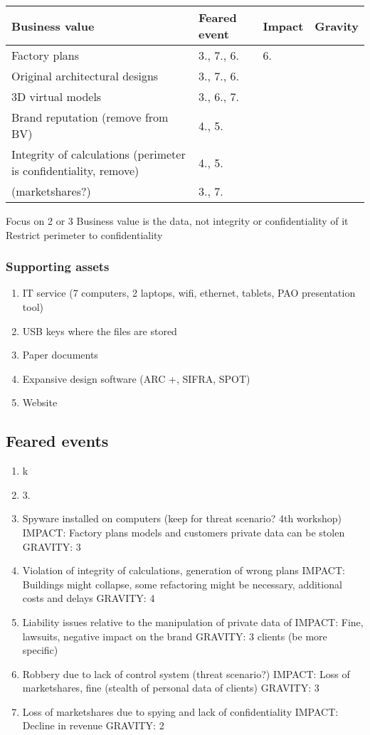 \begin{longtable}[]{@{}llll@{}}
\toprule
Business value & Feared event & Impact & Gravity\tabularnewline
\midrule
\endhead
Factory plans & 3., 7., 6. & 6. &\tabularnewline
Original architectural designs & 3., 7., 6. & &\tabularnewline
3D virtual models & 3., 6., 7. & &\tabularnewline
Brand reputation (remove from BV) & 4., 5. & &\tabularnewline
Integrity of calculations (perimeter is confidentiality, remove) & 4.,
5. & &\tabularnewline
(marketshares?) & 3., 7. & &\tabularnewline
\bottomrule
\end{longtable}

Focus on 2 or 3 Business value is the data, not integrity or
confidentiality of it Restrict perimeter to confidentiality

\hypertarget{Supportingux20assets}{%
\subsubsection{Supporting assets}\label{Supportingux20assets}}

\begin{enumerate}
\tightlist
\item
  IT service (7 computers, 2 laptops, wifi, ethernet, tablets, PAO
  presentation tool)
\item
  USB keys where the files are stored
\item
  Paper documents
\item
  Expansive design software (ARC +, SIFRA, SPOT)
\item
  Website
\end{enumerate}

\hypertarget{Fearedux20events}{%
\subsection{Feared events}\label{Fearedux20events}}

\begin{enumerate}
\tightlist
\item
  k
\item
  3.
\item
  Spyware installed on computers (keep for threat scenario? 4th
  workshop) IMPACT: Factory plans models and customers private data can
  be stolen GRAVITY: 3
\item
  Violation of integrity of calculations, generation of wrong plans
  IMPACT: Buildings might collapse, some refactoring might be necessary,
  additional costs and delays GRAVITY: 4
\item
  Liability issues relative to the manipulation of private data of
  IMPACT: Fine, lawsuits, negative impact on the brand GRAVITY: 3
  clients (be more specific)
\item
  Robbery due to lack of control system (threat scenario?) IMPACT: Loss
  of marketshares, fine (stealth of personal data of clients) GRAVITY: 3
\item
  Loss of marketshares due to spying and lack of confidentiality IMPACT:
  Decline in revenue GRAVITY: 2
\end{enumerate}


